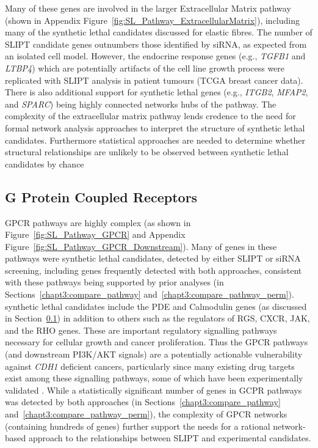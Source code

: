 Many of these genes are involved in the larger Extracellular Matrix \gls{pathway} (shown in Appendix Figure~\ref{fig:SL_Pathway_ExtracellularMatrix}), including many of the \gls{synthetic lethal} candidates discussed for elastic fibres. The number of \gls{SLIPT} candidate genes outnumbers those identified by \gls{siRNA}, as expected from an isolated cell model. However, the endocrine response genes (e.g., \textit{TGFB1} and \textit{LTBP4}) which are potentially artifacts of the cell line growth process were replicated with \gls{SLIPT} analysis in patient tumours (TCGA breast cancer data). There is also additional support for \gls{synthetic lethal} genes (e.g., \textit{ITGB2}, \textit{MFAP2}, and \textit{SPARC}) being highly connected networks hubs of the \gls{pathway}. The complexity of the extracellular matrix \gls{pathway} lends credence to the need for formal network analysis approaches to interpret the  structure of \gls{synthetic lethal} candidates. Furthermore statistical approaches are needed to determine whether structural relationships are unlikely to be observed between \gls{synthetic lethal} candidates by chance 

\FloatBarrier

\subsection{G Protein Coupled Receptors}  \label{chapt4:SL_Genes_GPCR}

\acrfull{GPCR} \glspl{pathway} are highly complex (as shown in Figure~\ref{fig:SL_Pathway_GPCR} and Appendix Figure~\ref{fig:SL_Pathway_GPCR_Downstream}). Many of genes in these \glspl{pathway} were \gls{synthetic lethal} candidates, detected by either \gls{SLIPT} or \gls{siRNA} screening, including genes frequently detected with both approaches, consistent with these \glspl{pathway} being supported by prior analyses (in Sections~\ref{chapt3:compare_pathway} and~\ref{chapt3:compare_pathway_perm}). \Gls{synthetic lethal} candidates include the \gls{PDE} and Calmodulin genes (as discussed in Section~\ref{chapt4:SL_Genes_GPCR}) in addition to others such as the regulators of \gls{RGS}, \gls{CXCR}, \acrfull{JAK}, and the \gls{RHO} genes. These are important regulatory signalling \glspl{pathway} necessary for cellular growth and cancer proliferation. Thus the \gls{GPCR} \glspl{pathway} (and downstream PI3K/AKT signals) are a potentially actionable vulnerability against \textit{CDH1} deficient cancers, particularly since many existing drug targets exist among these signalling \glspl{pathway}, some of which have been experimentally validated \citep{Telford2015}. While a statistically significant number of genes in GCPR \glspl{pathway} was detected by both approaches (in Sections~\ref{chapt3:compare_pathway} and~\ref{chapt3:compare_pathway_perm}), the complexity of \gls{GPCR} networks (containing hundreds of genes) further support the needs for a rational network-based approach to the relationships between \gls{SLIPT} and experimental candidates.

